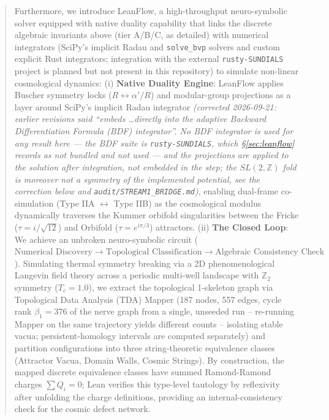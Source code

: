 \documentclass[11pt,a4paper]{article}
\newcommand{\numreconcile}[2]{#1}
\begin{document}
\begin{abstract}
Furthermore, we introduce LeanFlow, a high-throughput neuro-symbolic solver equipped with native duality capability that links the discrete algebraic invariants above (tier A/B/C, as detailed) with numerical integrators (SciPy's implicit Radau and \texttt{solve\_bvp} solvers and custom explicit Rust integrators; integration with the external \texttt{rusty-SUNDIALS} project is planned but not present in this repository) to simulate non-linear cosmological dynamics:
(i) \textbf{Native Duality Engine}: LeanFlow applies Buscher symmetry locks ($R \leftrightarrow \alpha'/R$) and modular-group projections as a layer around SciPy's implicit Radau integrator \emph{(corrected 2026-09-21: earlier revisions said ``embeds \dots directly into the adaptive Backward Differentiation Formula (BDF) integrator''. No BDF integrator is used for any result here --- the BDF suite is \texttt{rusty-SUNDIALS}, which \S\ref{sec:leanflow} records as not bundled and not used --- and the projections are applied to the solution after integration, not embedded in the step; the $SL(2,\mathbb{Z})$ fold is moreover not a symmetry of the implemented potential, see the correction below and \texttt{audit/STREAM1\_BRIDGE.md})}, enabling dual-frame co-simulation (Type IIA $\leftrightarrow$ Type IIB) as the cosmological modulus dynamically traverses the Kummer orbifold singularities between the Fricke ($\tau = i/\sqrt{12}$) and Orbifold ($\tau = e^{i\pi/3}$) attractors.
(ii) \textbf{The Closed Loop}: We achieve an unbroken neuro-symbolic circuit ($\text{Numerical Discovery} \to \text{Topological Classification} \to \text{Algebraic Consistency Check}$). Simulating thermal symmetry breaking via a 2D phenomenological Langevin field theory across a periodic multi-well landscape with $\mathbb{Z}_2$ symmetry ($T_c = 1.0$), we extract the topological 1-skeleton graph via Topological Data Analysis (TDA) Mapper (\numreconcile{187}{Mapper nodes} nodes, \numreconcile{557}{Mapper edges} edges, cycle rank $\beta_1 = \numreconcile{376}{cycle rank}$ of the nerve graph from a single, unseeded run -- re-running Mapper on the same trajectory yields different counts -- isolating stable vacua; persistent-homology intervals are computed separately) and partition configurations into three string-theoretic equivalence classes (Attractor Vacua, Domain Walls, Cosmic Strings). By construction, the mapped discrete equivalence classes have summed Ramond-Ramond charges $\sum Q_i = 0$; Lean verifies this type-level tautology by reflexivity after unfolding the charge definitions, providing an internal-consistency check for the cosmic defect network.

\end{abstract}
\end{document}
